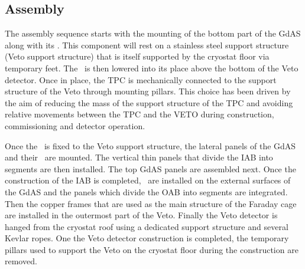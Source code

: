 \subsection{Assembly}

The assembly sequence starts with the mounting of the bottom part of the GdAS along with its \DSkPdms. This component will rest on a stainless steel support structure (Veto support structure) that is itself supported by the cryostat floor via temporary feet. The \TPC\ is then lowered into its place above the bottom of the Veto detector. Once in place, the TPC is mechanically connected to the support structure of the Veto through mounting pillars. This choice has been driven by the aim of reducing the mass of the support structure of the TPC and avoiding relative movements between the TPC and the VETO during construction, commissioning and detector operation. 

Once the \TPC\ is fixed to the Veto support structure, the lateral panels of the GdAS and their \DSkPdms\ are mounted.  The vertical thin panels that divide the IAB into segments are then installed. The top GdAS panels are assembled next. Once the construction of the IAB is completed, \DSkPdms\ are installed on the external surfaces of the GdAS and the panels which divide the OAB into segments are integrated. Then the copper frames that are used as the main structure of the Faraday cage are installed in the outermost part of the Veto. Finally the Veto detector is hanged from the cryostat roof using a dedicated support structure and several Kevlar ropes. One the Veto detector construction is completed, the temporary pillars used to support the Veto on the cryostat floor during the construction are removed. 

